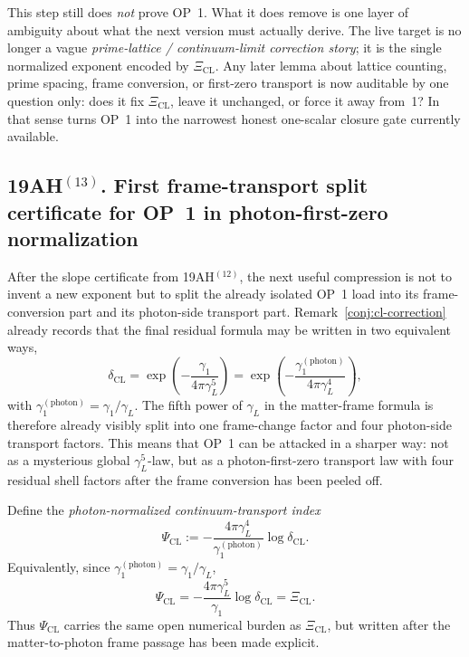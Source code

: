 \begin{remark}
This step still does \emph{not} prove OP~1. What it does remove is one layer of ambiguity about what the next version must actually derive. The live target is no longer a vague \emph{prime-lattice / continuum-limit correction story}; it is the single normalized exponent encoded by \(\Xi_{\mathrm{CL}}\). Any later lemma about lattice counting, prime spacing, frame conversion, or first-zero transport is now auditable by one question only: does it fix \(\Xi_{\mathrm{CL}}\), leave it unchanged, or force it away from~1? In that sense turns OP~1 into the narrowest honest one-scalar closure gate currently available.
\end{remark}


\subsection*{19AH$^{(13)}$. First frame-transport split certificate for OP~1 in photon-first-zero normalization}
After the slope certificate from 19AH$^{(12)}$, the next useful compression is not to invent a new exponent but to split the already isolated OP~1 load into its frame-conversion part and its photon-side transport part. Remark~\ref{conj:cl-correction} already records that the final residual formula may be written in two equivalent ways,
\[
 \delta_{\mathrm{CL}}
 = \exp\!\left(-\frac{\gamma_1}{4\pi\gamma_L^5}\right)
 = \exp\!\left(-\frac{\gamma_1^{(\mathrm{photon})}}{4\pi\gamma_L^4}\right),
\]
with \(\gamma_1^{(\mathrm{photon})}=\gamma_1/\gamma_L\). The fifth power of \(\gamma_L\) in the matter-frame formula is therefore already visibly split into one frame-change factor and four photon-side transport factors. This means that OP~1 can be attacked in a sharper way: not as a mysterious global \(\gamma_L^5\)-law, but as a photon-first-zero transport law with four residual shell factors after the frame conversion has been peeled off.

\begin{definition}
\label{def:psi-cl}
Define the \emph{photon-normalized continuum-transport index}
\[
 \Psi_{\mathrm{CL}}
 :=
 -\frac{4\pi\gamma_L^4}{\gamma_1^{(\mathrm{photon})}}\log \delta_{\mathrm{CL}}.
\]
Equivalently, since \(\gamma_1^{(\mathrm{photon})}=\gamma_1/\gamma_L\),
\[
 \Psi_{\mathrm{CL}}
 =
 -\frac{4\pi\gamma_L^5}{\gamma_1}\log \delta_{\mathrm{CL}}
 = \Xi_{\mathrm{CL}}.
\]
Thus \(\Psi_{\mathrm{CL}}\) carries the same open numerical burden as \(\Xi_{\mathrm{CL}}\), but written after the matter-to-photon frame passage has been made explicit.
\end{definition}


